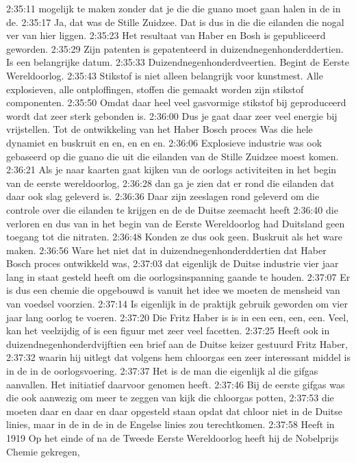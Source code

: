 2:35:11
mogelijk te maken zonder dat je die die guano moet gaan halen in de in de.
2:35:17
Ja, dat was de Stille Zuidzee. Dat is dus in die die eilanden die nogal ver van hier liggen.
2:35:23
Het resultaat van Haber en Bosh is gepubliceerd geworden.
2:35:29
Zijn patenten is gepatenteerd in duizendnegenhonderddertien. Is een belangrijke datum.
2:35:33
Duizendnegenhonderdveertien. Begint de Eerste Wereldoorlog.
2:35:43
Stikstof is niet alleen belangrijk voor kunstmest. Alle explosieven, alle ontploffingen, stoffen die gemaakt worden zijn stikstof componenten.
2:35:50
Omdat daar heel veel gasvormige stikstof bij geproduceerd wordt dat zeer sterk gebonden is.
2:36:00
Dus je gaat daar zeer veel energie bij vrijstellen. Tot de ontwikkeling van het Haber Bosch proces Was die hele dynamiet en buskruit en en, en en en.
2:36:06
Explosieve industrie was ook gebaseerd op die guano die uit die eilanden van de Stille Zuidzee moest komen.
2:36:21
Als je naar kaarten gaat kijken van de oorlogs activiteiten in het begin van de eerste wereldoorlog,
2:36:28
dan ga je zien dat er rond die eilanden dat daar ook slag geleverd is.
2:36:36
Daar zijn zeeslagen rond geleverd om die controle over die eilanden te krijgen en de de Duitse zeemacht heeft
2:36:40
die verloren en dus van in het begin van de Eerste Wereldoorlog had Duitsland geen toegang tot die nitraten.
2:36:48
Konden ze dus ook geen. Buskruit als het ware maken.
2:36:56
Ware het niet dat in duizendnegenhonderddertien dat Haber Bosch proces ontwikkeld was,
2:37:03
dat eigenlijk de Duitse industrie vier jaar lang in staat gesteld heeft om die oorlogsinspanning gaande te houden.
2:37:07
Er is dus een chemie die opgebouwd is vanuit het idee we moeten de mensheid van van voedsel voorzien.
2:37:14
Is eigenlijk in de praktijk gebruik geworden om vier jaar lang oorlog te voeren.
2:37:20
Die Fritz Haber is is in een een, een, een. Veel, kan het veelzijdig of is een figuur met zeer veel facetten.
2:37:25
Heeft ook in duizendnegenhonderdvijftien een brief aan de Duitse keizer gestuurd Fritz Haber,
2:37:32
waarin hij uitlegt dat volgens hem chloorgas een zeer interessant middel is in de in de oorlogsvoering.
2:37:37
Het is de man die eigenlijk al die gifgas aanvallen. Het initiatief daarvoor genomen heeft.
2:37:46
Bij de eerste gifgas was die ook aanwezig om meer te zeggen van kijk die chloorgas potten,
2:37:53
die moeten daar en daar en daar opgesteld staan opdat dat chloor niet in de Duitse linies, maar in de in de in de Engelse linies zou terechtkomen.
2:37:58
Heeft in 1919 Op het einde of na de Tweede Eerste Wereldoorlog heeft hij de Nobelprijs Chemie gekregen,
